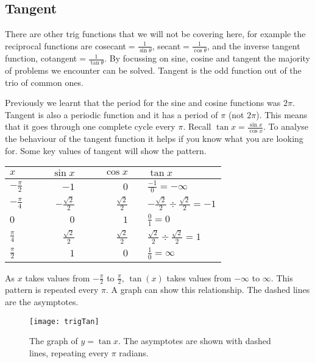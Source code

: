 \subsection*{Tangent}
 There are other trig functions that we will not be covering here, for example the reciprocal functions are cosecant$=\frac{1}{\sin\theta}$, secant$=\frac{1}{\cos\theta}$, and the inverse tangent function, cotangent$=\frac{1}{\tan\theta}$. By focussing on sine, cosine and tangent the majority of problems we encounter can be solved. Tangent is the odd function out of the trio of common ones.

Previously we learnt that the period for the sine and cosine functions was $2 \pi $. Tangent is also a periodic function and it has a period of $\pi $ (not $2 \pi $). This means that it goes through one complete cycle every $\pi$. Recall $\tan  x =\frac{\sin  x}{\cos  x}$. To analyse the behaviour of the tangent function it helps if you know what you are looking for. Some key values of tangent will show the pattern. 
\begin{center}
\begin{tabular}{lrrrl}\toprule
	$x$  & $\qquad\sin  x$  & $\qquad\cos  x$  &\qquad\quad& $\tan  x$  \\
	\midrule
	$ -\frac{\pi }{2}$  & $ -1$  & $0$  && $\frac{ -1}{0} = -\infty $  \\
	\midrule
	$ -\frac{\pi }{4}$  & $ -\frac{\sqrt{2}}{2}$  & $\frac{\sqrt{2}}{2}$  && $ -\frac{\sqrt{2}}{2} \div \frac{\sqrt{2}}{2} = -1$  \\
	\midrule
	$0$  & $0$  & $1$  && $\frac{0}{1} =0$  \\
	\midrule
	$\frac{\pi }{4}$  & $\frac{\sqrt{2}}{2}$  & $\frac{\sqrt{2}}{2}$  && $\frac{\sqrt{2}}{2} \div \frac{\sqrt{2}}{2} =1$  \\
	\midrule
	$\frac{\pi }{2}$  & $1$  & $0$  && $\frac{1}{0} =\infty $  \\
	\bottomrule
\end{tabular}
\end{center}
As $x$ takes values from $ -\frac{\pi }{2}$ to $\frac{\pi }{2}$, $\tan(x)$ takes values from $ -\infty $ to $\infty $. This pattern is repeated every $\pi $. 
A \desmos graph can show this relationship. The dashed lines are the asymptotes.

\begin{figure}\begin{center}
\texttt{[image: trigTan]}
\caption{The graph of $y=\tan x$. The asymptotes are shown with dashed lines, repeating every $\pi$ radians.}
\end{center}\end{figure}

